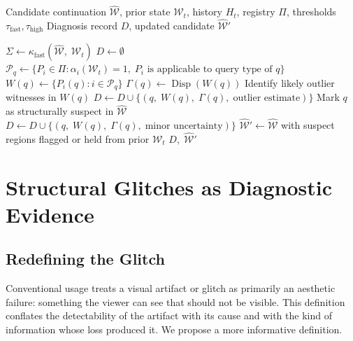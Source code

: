 \documentclass[12pt,a4paper]{article}
\theoremstyle{plain}
\theoremstyle{definition}
\theoremstyle{remark}
\DeclareMathOperator{\Disp}{Disp}
\begin{document}
\begin{algorithm}[h]
\caption{Witness-Based Structural Diagnosis}
\label{alg:witness}
\begin{algorithmic}[1]
\Require Candidate continuation $\hat{\mathcal{W}}$, prior state $\mathcal{W}_t$, history $H_t$, registry $\Pi$, thresholds $\tau_{\text{fast}}, \tau_{\text{high}}$
\Ensure Diagnosis record $D$, updated candidate $\hat{\mathcal{W}}'$

\State $\Sigma \gets \kappa_{\text{fast}}(\hat{\mathcal{W}},\; \mathcal{W}_t)$ 
\State $D \gets \emptyset$
    \State $\mathcal{P}_q \gets \{ P_i \in \Pi : \alpha_i(\mathcal{W}_t) = 1,\; P_i \text{ is applicable to query type of } q\}$
    \State $W(q) \gets \{ P_i(q) : i \in \mathcal{P}_q \}$
    \State $\Gamma(q) \gets \Disp(W(q))$
        \State Identify likely outlier witnesses in $W(q)$
        \State $D \gets D \cup \{(q,\; W(q),\; \Gamma(q),\; \text{outlier estimate})\}$
        \State Mark $q$ as structurally suspect in $\hat{\mathcal{W}}$
        \State $D \gets D \cup \{(q,\; W(q),\; \Gamma(q),\; \text{minor uncertainty})\}$
    \EndIf
\EndFor
\State $\hat{\mathcal{W}}' \gets \hat{\mathcal{W}}$ with suspect regions flagged or held from prior $\mathcal{W}_t$
\State \Return $D,\; \hat{\mathcal{W}}'$
\end{algorithmic}
\end{algorithm}

\section{Structural Glitches as Diagnostic Evidence}
\label{sec:glitches}

\subsection{Redefining the Glitch}

Conventional usage treats a visual artifact or glitch as primarily an aesthetic failure: something the viewer can see that should not be visible. This definition conflates the detectability of the artifact with its cause and with the kind of information whose loss produced it. We propose a more informative definition.
\end{document}
